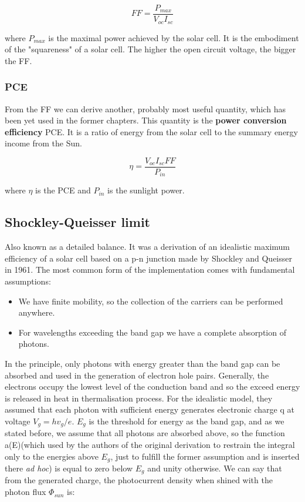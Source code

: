 \begin{equation}
FF = \frac{P_{max}}{V_{oc}I_{sc}}
\end{equation}

where $P_{max}$ is the maximal power achieved by the solar cell. It is the   embodiment of the "squareness" of a solar cell. The higher the open circuit voltage, the bigger the FF. 

\subsubsection{PCE}

From the FF we can derive another, probably most useful quantity, which has been yet used in the former chapters. This quantity is the \textbf{power conversion efficiency} PCE. It is a ratio of energy from the solar cell to the summary energy income from the Sun. 

\begin{equation}
\eta = \frac{V_{oc}I_{sc}FF}{P_{in}}
\end{equation}

where $\eta$ is the PCE and $P_{in}$ is the sunlight power. 

\subsection{Shockley-Queisser limit}

Also known as a detailed balance. It was a derivation of an idealistic maximum efficiency of a solar cell based on a p-n junction made by Shockley and Queisser in 1961\cite{limit}. The most common form of the implementation comes with fundamental assumptions:

\begin{itemize}
\item We have finite mobility, so the collection of the carriers can be performed anywhere.
\item For wavelengths exceeding the band gap we have a complete absorption of photons.
\end{itemize}


In the principle, only photons with energy greater than the band gap can be absorbed and used in the generation of electron hole pairs. Generally, the electrons occupy the lowest level of the conduction band and so the exceed energy is released in heat in thermalisation process. For the idealistic model, they assumed that each photon with sufficient energy generates electronic charge q at voltage $V_g=hv_g/e$. $E_g$ is the threshold for energy as the band gap, and as we stated before, we assume that all photons are absorbed above, so the function a(E)(which used by the authors of the original derivation to restrain the integral only to the energies above $E_g$, just to fulfill the former assumption and is inserted there \textit{ad hoc}) is equal to zero below $E_g$ and unity otherwise. We can say that from the generated charge, the photocurrent density when shined with the photon flux $\Phi _{sun}$ is:

